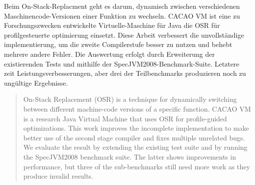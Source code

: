 \documentclass[draft,final]{vutinfth} %
\begin{document}
    \frontmatter %

    \addstatementpage



    \begin{kurzfassung}
        Beim On-Stack-Replacment geht es darum, dynamisch zwischen verschiedenen Maschinencode-Versionen einer Funktion zu wechseln.
        CACAO VM ist eine zu Forschungszwecken entwickelte Virtuelle-Maschine für Java die OSR für profilgesteuerte optimierung einsetzt.
        Diese Arbeit verbessert die unvollständige implementierung,
        um die zweite Compilerstufe besser zu nutzen
        und behebt mehrere andere Fehler.
        Die Auswertung erfolgt durch Erweiterung der existierenden Tests
        und mithilfe der SpecJVM2008-Benchmark-Suite.
        Letztere zeit Leistungsverbesserungen,
        aber drei der Teilbenchmarks produzieren noch zu ungültige Ergebnisse.
    \end{kurzfassung}

    \begin{abstract}
        On-Stack Replacement (OSR) is a technique for dynamically switching between different machine-code versions of a specific function.
        CACAO VM is a research Java Virtual Machine that uses OSR for profile-guided optimizations.
        This work improves the incomplete implementation
        to make better use of the second stage compiler
        and fixes multiple unrelated bugs.
        We evaluate the result by extending the existing test suite
        and by running the SpecJVM2008 benchmark suite.
        The latter shows improvements in performance,
        but three of the sub-benchmarks still need more work as they produce invalid results.
    \end{abstract}


    \tableofcontents %
\end{document}
